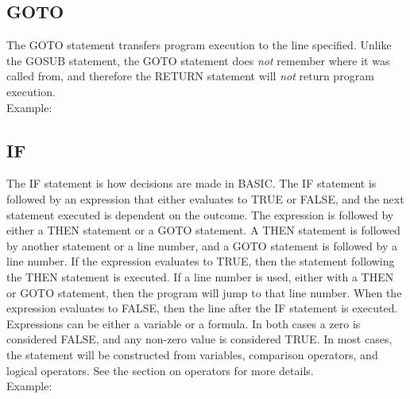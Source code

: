 \subsection{GOTO}

The {\ttfamily GOTO} statement transfers program execution to the line
specified.  Unlike the {\ttfamily GOSUB} statement, the {\ttfamily GOTO}
statement does {\em not} remember where it was called from, and therefore the
{\ttfamily RETURN} statement will {\em not} return program execution.\\

Example:\\


\subsection{IF}

The {\ttfamily IF} statement is how decisions are made in BASIC.  The
{\ttfamily IF} statement is followed by an expression that either evaluates to
{\ttfamily TRUE} or {\ttfamily FALSE}, and the next statement executed is
dependent on the outcome.  The expression is followed by either a {\ttfamily
THEN} statement or a {\ttfamily GOTO} statement.  A {\ttfamily THEN} statement
is followed by another statement or a line number, and a {\ttfamily GOTO
statement} is followed by a line number.  If the expression evaluates to
{\ttfamily TRUE}, then the statement following the {\ttfamily THEN} statement
is executed.  If a line number is used, either with a {\ttfamily THEN} or
{\ttfamily GOTO} statement, then the program will jump to that line number.
When the expression evaluates to {\ttfamily FALSE}, then the line after the
{\ttfamily IF} statement is executed.\\

Expressions can be either a variable or a formula.  In both cases a zero is
considered {\ttfamily FALSE}, and any non-zero value is considered {\ttfamily
TRUE}.  In most cases, the statement will be constructed from variables,
comparison operators, and logical operators.  See the section on operators for
more details.\\

Example:\\

